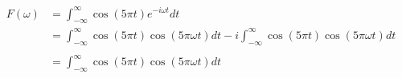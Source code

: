 \documentclass[preview]{standalone}
\begin{document}
\begin{align*}
F(\omega)&= \int_{-\infty}^{\infty} \cos{(5\pi t)}e^{-i\omega t} dt \\ &=\int_{-\infty}^{\infty} \cos{(5\pi t)}\cos{(5\pi\omega t)} dt - i\int_{-\infty}^{\infty} \cos{(5\pi t)}\cos{(5\pi\omega t)} dt \\ \\ &=\int_{-\infty}^{\infty} \cos{(5\pi t)}\cos{(5\pi\omega t)} dt
\end{align*}
\end{document}
